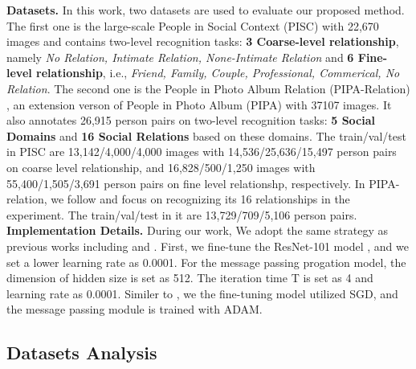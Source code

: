 \documentclass{article}
\begin{document}
{\bf Datasets.} In this work, two datasets are used to evaluate our proposed method. The first one is the large-scale People in Social Context (PISC) \cite{DBLP:conf/iccv/LiWZK17} with 22,670 images and contains two-level recognition tasks: {\bf 3 Coarse-level relationship}, namely {\it No Relation, Intimate Relation, None-Intimate Relation} and {\bf 6 Fine-level relationship}, i.e., {\it Friend, Family, Couple, Professional, Commerical, No Relation}. The second one is the People in Photo Album Relation (PIPA-Relation) \cite{DBLP:conf/cvpr/SunSF17}, an extension verson of People in Photo Album (PIPA) \cite{DBLP:conf/cvpr/ZhangPTFB15} with 37107 images. It also annotates 26,915 person pairs on two-level recognition tasks: {\bf 5 Social Domains} and {\bf 16 Social Relations} based on these domains. The train/val/test in PISC are 13,142/4,000/4,000 images with 14,536/25,636/15,497 person pairs on coarse level relationship, and 16,828/500/1,250 images with 55,400/1,505/3,691 person pairs on fine level relationshp, respectively. In PIPA-relation, we follow \cite{DBLP:conf/ijcai/WangCRYCL18} and focus on recognizing its 16 relationships in the experiment. The train/val/test in it are 13,729/709/5,106 person pairs. \\
{\bf Implementation Details.} During our work, We adopt the same strategy as previous works including \cite{DBLP:conf/iccv/LiWZK17} and \cite{DBLP:conf/ijcai/WangCRYCL18}. First, we fine-tune the ResNet-101 model \cite{DBLP:conf/cvpr/HeZRS16} , and we set a lower learning rate as 0.0001. For the message passing progation model, the dimension of hidden size is set as 512. The iteration time T is set as 4 and learning rate as 0.0001. Similer to \cite{DBLP:conf/ijcai/WangCRYCL18}, we the fine-tuning model utilized SGD, and the message passing module is trained with ADAM.

\subsection{Datasets Analysis}\label{section:dataset_anaysis}
\end{document}
